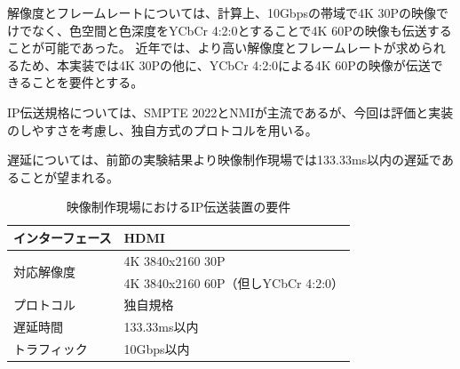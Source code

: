 解像度とフレームレートについては、計算上、10Gbpsの帯域で4K 30Pの映像でけでなく、色空間と色深度をYCbCr 4:2:0とすることで4K 60Pの映像も伝送することが可能であった。
近年では、より高い解像度とフレームレートが求められるため、本実装では4K 30Pの他に、YCbCr 4:2:0による4K 60Pの映像が伝送できることを要件とする。

IP伝送規格については、SMPTE 2022とNMIが主流であるが、今回は評価と実装のしやすさを考慮し、独自方式のプロトコルを用いる。

遅延については、前節の実験結果より映像制作現場では133.33ms以内の遅延であることが望まれる。

\begin{table}[htbp]
  \caption{映像制作現場におけるIP伝送装置の要件}
  \label{tb:ip-youken}
  \begin{center}
  \begin{tabular}{l|l}
    \hline
    インターフェース   & HDMI \\\hline
    \multirow{2}{*}{対応解像度} & 4K 3840x2160 30P \\\cline{2-2}
                              & 4K 3840x2160 60P（但しYCbCr 4:2:0）  \\\hline
    プロトコル        & 独自規格 \\\hline
    遅延時間          & 133.33ms以内 \\\hline
    トラフィック      & 10Gbps以内 \\\hline
  \end{tabular}\end{center}
\end{table}

